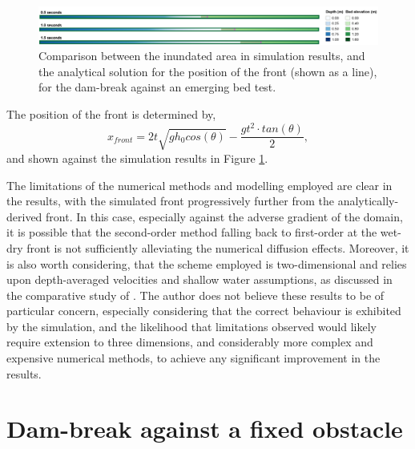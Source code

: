 \begin{figure}
	\centering
	\includegraphics[width=1.05\textheight]{numerical-test-figures/dam-break-emerging-bed-example.png}
	\caption{Comparison between the inundated area in simulation results, and the analytical solution for the position of the front (shown as a line), for the dam-break against an emerging bed test.}
	\label{TestResult_EmergingBed}
\end{figure}

The position of the front is determined by,
\begin{equation}
\label{Test_EmergingBed_FrontPosition}
x_{front} = 2t \sqrt{g h_0 cos(\theta)} - \frac{gt^2 \cdot tan(\theta)}{2},
\end{equation} and shown against the simulation results in Figure \ref{TestResult_EmergingBed}.

The limitations of the numerical methods and modelling employed are clear in the results, with the simulated front progressively further from the analytically-derived front. In this case, especially against the adverse gradient of the domain, it is possible that the second-order method falling back to first-order at the wet-dry front is not sufficiently alleviating the numerical diffusion effects. Moreover, it is also worth considering, that the scheme employed is two-dimensional and relies upon depth-averaged velocities and shallow water assumptions, as discussed in the comparative study of \citet{Liang2010}. The author does not believe these results to be of particular concern, especially considering that the correct behaviour is exhibited by the simulation, and the likelihood that  limitations observed would likely require extension to three dimensions, and considerably more complex and expensive numerical methods, to achieve any significant improvement in the results. 

\section{Dam-break against a fixed obstacle}


